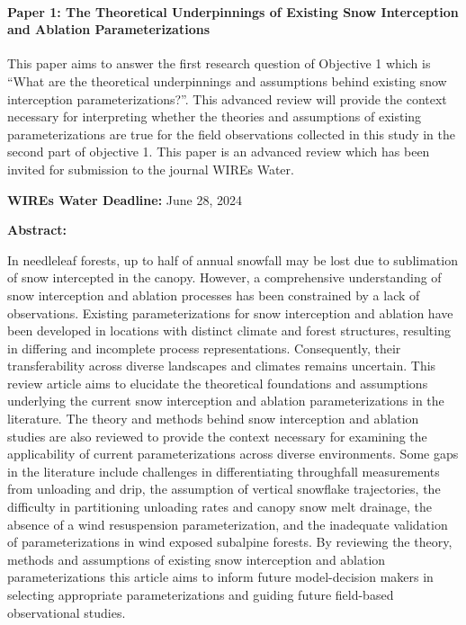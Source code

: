 \documentclass[
  letterpaper,
  DIV=11,
  numbers=noendperiod]{scrartcl}
\let\oldparagraph\paragraph
\renewcommand{\paragraph}[1]{\oldparagraph{#1}\mbox{}}
\begin{document}
\paragraph{Paper 1: The Theoretical Underpinnings of Existing Snow
Interception and Ablation
Parameterizations}\label{paper-1-the-theoretical-underpinnings-of-existing-snow-interception-and-ablation-parameterizations}

This paper aims to answer the first research question of Objective 1
which is ``What are the theoretical underpinnings and assumptions behind
existing snow interception parameterizations?''. This advanced review
will provide the context necessary for interpreting whether the theories
and assumptions of existing parameterizations are true for the field
observations collected in this study in the second part of objective 1.
This paper is an advanced review which has been invited for submission
to the journal WIREs Water.

\textbf{WIREs Water Deadline:} June 28, 2024

\textbf{Abstract:}

In needleleaf forests, up to half of annual snowfall may be lost due to
sublimation of snow intercepted in the canopy. However, a comprehensive
understanding of snow interception and ablation processes has been
constrained by a lack of observations. Existing parameterizations for
snow interception and ablation have been developed in locations with
distinct climate and forest structures, resulting in differing and
incomplete process representations. Consequently, their transferability
across diverse landscapes and climates remains uncertain. This review
article aims to elucidate the theoretical foundations and assumptions
underlying the current snow interception and ablation parameterizations
in the literature. The theory and methods behind snow interception and
ablation studies are also reviewed to provide the context necessary for
examining the applicability of current parameterizations across diverse
environments. Some gaps in the literature include challenges in
differentiating throughfall measurements from unloading and drip, the
assumption of vertical snowflake trajectories, the difficulty in
partitioning unloading rates and canopy snow melt drainage, the absence
of a wind resuspension parameterization, and the inadequate validation
of parameterizations in wind exposed subalpine forests. By reviewing the
theory, methods and assumptions of existing snow interception and
ablation parameterizations this article aims to inform future
model-decision makers in selecting appropriate parameterizations and
guiding future field-based observational studies.
\end{document}

